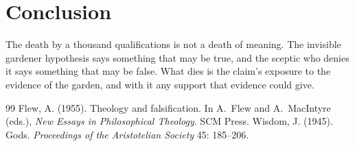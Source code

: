 \documentclass{situationist-preprint}
\begin{document}
\section{Conclusion}

The death by a thousand qualifications is not a death of meaning. The invisible gardener hypothesis says something that may be true, and the sceptic who denies it says something that may be false. What dies is the claim's exposure to the evidence of the garden, and with it any support that evidence could give.

\begin{thebibliography}{99}\small
{} Flew, A. (1955). Theology and falsification. In A.~Flew and A.~MacIntyre (eds.), \emph{New Essays in Philosophical Theology}. SCM Press.
 Wisdom, J. (1945). Gods. \emph{Proceedings of the Aristotelian Society} 45: 185--206.
\end{thebibliography}
\end{document}

